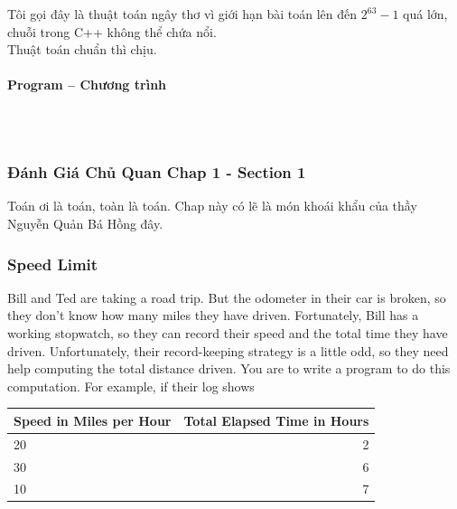 \documentclass{article}
\begin{document}
Tôi gọi đây là thuật toán ngây thơ vì giới hạn bài toán lên đến $2^{63} - 1$ quá lớn, chuỗi trong C++ không thể chứa nổi.\\

Thuật toán chuẩn thì chịu.

\paragraph{Program -- Chương trình} \mbox{} \\


\begin{lstlisting}

\end{lstlisting}


\subsubsection{Đánh Giá Chủ Quan Chap 1 - Section 1}
Toán ơi là toán, toàn là toán. Chap này có lẽ là món khoái khẩu của thầy Nguyễn Quản Bá Hồng đây.


\subsubsection{Speed Limit}

Bill and Ted are taking a road trip. But the odometer in their car is broken, so they don’t know how many miles they have driven. Fortunately, Bill has a working stopwatch, so they can record their speed and the total time they have driven. Unfortunately, their record-keeping strategy is a little odd, so they need help computing the total distance driven. You are to write a program to do this computation.
For example, if their log shows\\

\begin{table}[h]
    \centering
    \begin{tabular}{|l|r|}
        \hline
        \textbf{Speed in Miles per Hour} & \textbf{Total Elapsed Time in Hours} \\
        \hline
        20  & 2  \\ \hline
        30  & 6 \\ \hline
        10  & 7 \\  \hline
    \end{tabular}
\end{table}
\end{document}
